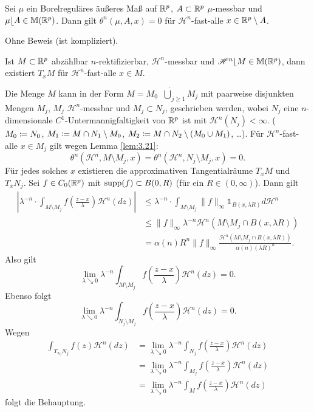 \documentclass[a4paper,twoside,DIV15,BCOR12mm]{scrbook}
\newcommand{\ind}{\mathds 1}
\newcommand{\HM}{\mathscr H}
\newcommand{\downto}{\mathrel\searrow}
\newcommand{\MR}{\lfloor}
\begin{document}
\begin{lemma}\label{lem:3.21}
Sei \(\mu\) ein Borelreguläres äußeres Maß auf \(\mathbb{R}^p\), \(A \subset \mathbb{R}^p\) \(\mu\)-messbar und \(\mu\MR A\in \mathbb{M}(\MdR^p)\). Dann gilt \(\theta^n(\mu,A,x)=0\) für \(\HM^n\)-fast-alle \(x\in\mathbb{R}^p\setminus A\).
\end{lemma}
Ohne Beweis (ist kompliziert).

\begin{proposition}\label{prop:3.22}
Ist \(M \subset \mathbb{R}^p\) abzählbar \(n\)-rektifizierbar, \(\HM^n\)-messbar und \(\HM^n\MR M \in \mathbb{M}(\MdR^p)\), dann existiert \(T_x M\) für \(\HM^n\)-fast-alle \(x \in M\).
\end{proposition}

\begin{beweis}
Die Menge \(M\) kann in der Form \(M = M_0 \mathop{\dot\cup} {\dot\bigcup}_{j\geq 1} M_j\) mit paarweise disjunkten Mengen \(M_j\), \(M_j\) \(\HM^n\)-messbar und \(M_j \subset N_j\), geschrieben werden, wobei \(N_j\) eine \(n\)-dimensionale \(C^1\)-Untermannigfaltigkeit von \(\mathbb{R}^p\) ist mit \(\HM^n(N_j)<\infty\). (\(M_0 \da N_0\), \(M_1 \da M \cap N_1 \setminus M_0\), \(M_2 \da M \cap N_2 \setminus (M_0 \cup M_1)\), \dots). Für \(\HM^n\)-fast-alle \(x \in M_j\) gilt wegen Lemma \ref{lem:3.21}:
\[
\theta^n(\HM^n, M \setminus M_j, x) = \theta^n(\HM^n, N_j \setminus M_j, x) = 0.
\]
Für jedes solches \(x\) existieren die approximativen Tangentialräume \(T_x M\) und \(T_x N_j\). Sei \(f \in C_0(\mathbb{R}^p)\) mit \(\mathop{\rm supp}\nolimits(f) \subset B(0,R)\) (für ein \(R \in (0,\infty)\)). Dann gilt
\begin{align*}
\left| \lambda^{-n} \cdot \int_{M\setminus M_j} f(\frac{z-x}\lambda) \HM^n(dz) \right| &\leq \lambda^{-n} \cdot \int_{M\setminus M_j} \|f\|_\infty \ind_{B(x,\lambda R)} d\HM^n \\
&\leq \|f\|_\infty \lambda^{-n} \HM^n(M\setminus M_j\cap B(x,\lambda R)) \\
&= \alpha(n) R^n \|f\|_\infty \frac{\HM^n (M\setminus M_j \cap B(x,\lambda R))}{\alpha(n) (\lambda R)^n}.
\end{align*}
Also gilt
\[\lim_{\lambda \downto 0} \lambda^{-n} \int_{M\setminus M_j} f(\frac{z-x}\lambda) \HM^n (dz) = 0.
\] 
Ebenso folgt
\[
\lim_{\lambda\downto0} \lambda^{-n} \int_{N_j\setminus M_j} f(\frac{z-x}\lambda) \HM^n(dz) = 0.
\]
Wegen
\begin{align*}
\int_{T_{x_0}N_j} f(z) \HM^n(dz) &= \lim_{\lambda\downto0} \lambda^{-n}\int_{N_j} f(\frac{z-x}\lambda) \HM^n(dz) \\
&= \lim_{\lambda\downto0} \lambda^{-n} \int_{M_j} f(\frac{z-x}\lambda)\HM^n(dz) \\
&= \lim_{\lambda\downto0} \lambda^{-n} \int_M f(\frac{z-x}\lambda) \HM^n(dz)
\end{align*}
folgt die Behauptung.
\end{beweis}
\end{document}
